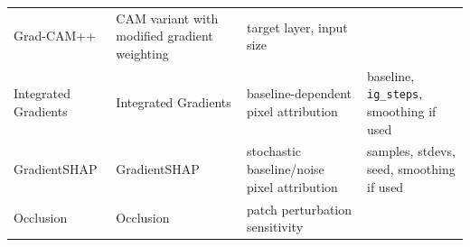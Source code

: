 \begin{longtable}[]{@{}llll@{}}
\begin{minipage}[t]{0.17\columnwidth}
		Grad-CAM++\strut
	\end{minipage} & \begin{minipage}[t]{0.17\columnwidth}\raggedright
		CAM variant with modified gradient weighting\strut
	\end{minipage} & \begin{minipage}[t]{0.17\columnwidth}\raggedright
		target layer, input size\strut
	\end{minipage}\tabularnewline
	\begin{minipage}[t]{0.17\columnwidth}\raggedright
		Integrated Gradients\strut
	\end{minipage} & \begin{minipage}[t]{0.17\columnwidth}\raggedright
		Integrated Gradients\strut
	\end{minipage} & \begin{minipage}[t]{0.17\columnwidth}\raggedright
		baseline-dependent pixel attribution\strut
	\end{minipage} & \begin{minipage}[t]{0.17\columnwidth}\raggedright
		baseline, \texttt{ig\_\allowbreak steps}, smoothing if used\strut
	\end{minipage}\tabularnewline
	\begin{minipage}[t]{0.17\columnwidth}\raggedright
		GradientSHAP\strut
	\end{minipage} & \begin{minipage}[t]{0.17\columnwidth}\raggedright
		GradientSHAP\strut
	\end{minipage} & \begin{minipage}[t]{0.17\columnwidth}\raggedright
		stochastic baseline/noise pixel attribution\strut
	\end{minipage} & \begin{minipage}[t]{0.17\columnwidth}\raggedright
		samples, stdevs, seed, smoothing if used\strut
	\end{minipage}\tabularnewline
	\begin{minipage}[t]{0.17\columnwidth}\raggedright
		Occlusion\strut
	\end{minipage} & \begin{minipage}[t]{0.17\columnwidth}\raggedright
		Occlusion\strut
	\end{minipage} & \begin{minipage}[t]{0.17\columnwidth}\raggedright
		patch perturbation sensitivity\strut
	\end{minipage} & \begin{minipage}[t]{0.17\columnwidth}\raggedright

\end{minipage}
\end{longtable}
